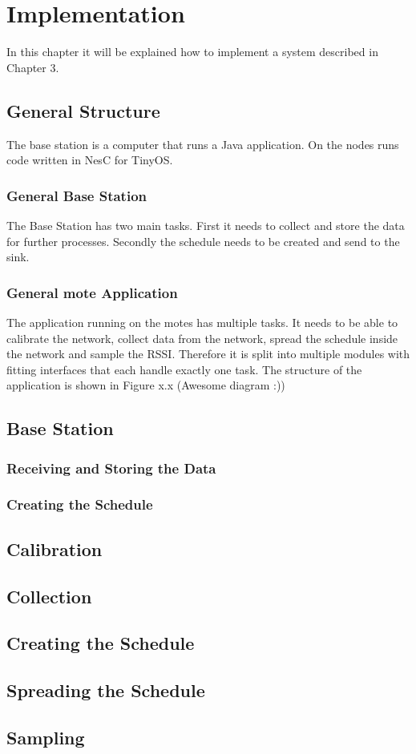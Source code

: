 \chapter{Implementation}

In this chapter it will be explained how to implement a system described in Chapter 3. 

\section{General Structure}
The base station is a computer that runs a Java application. On the nodes runs code written in NesC for TinyOS.
\subsection{General Base Station}
The Base Station has two main tasks. First it needs to collect and store the data for further processes.
Secondly the schedule needs to be created and send to the sink.  
\subsection{General mote Application}
The application running on the motes has multiple tasks. It needs to be able to calibrate the network, collect data from the network, spread the schedule inside the network and sample the RSSI. Therefore it is split into multiple modules with fitting interfaces that each handle exactly one task. The structure of the application is shown in Figure x.x (Awesome diagram :))   

\section{Base Station}
\subsection{Receiving and Storing the Data}

\subsection{Creating the Schedule}
\section{Calibration}
\section{Collection}
\section{Creating the Schedule}
\section{Spreading the Schedule}
\section{Sampling}